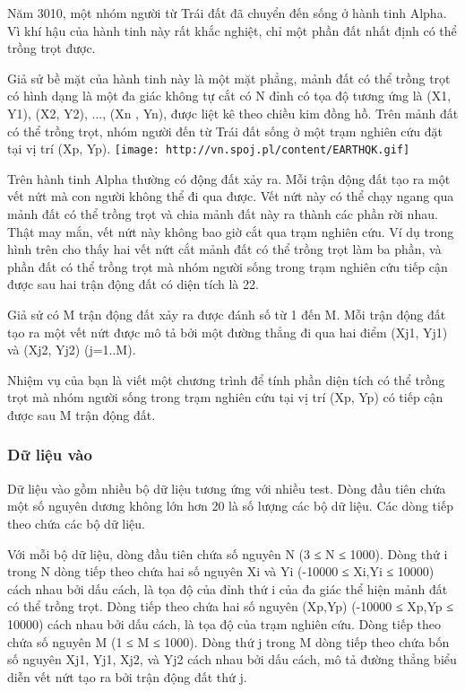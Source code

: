 



   Năm 3010, một nhóm người từ Trái đất đã chuyển đến sống ở hành tinh Alpha. Vì khí hậu của hành tinh này rất khắc nghiệt, chỉ một phần đất nhất định có thể trồng trọt được.  

   Giả sử bề mặt của hành tinh này là một mặt phẳng, mảnh đất có thể trồng trọt có hình dạng là một đa giác không tự cắt có N đỉnh có tọa độ tương ứng là (X1, Y1), (X2, Y2), ..., (Xn , Yn), được liệt kê theo chiều kim đồng hồ. Trên mảnh đất có thể trồng trọt, nhóm người đến từ Trái đất sống ở một trạm nghiên cứu đặt tại vị trí (Xp, Yp).  
\texttt{[image: http://vn.spoj.pl/content/EARTHQK.gif]}

   Trên hành tinh Alpha thường có động đất xảy ra. Mỗi trận động đất tạo ra một vết nứt mà con người không thể đi qua được. Vết nứt này có thể chạy ngang qua mảnh đất có thể trồng trọt và chia mảnh đất này ra thành các phần rời nhau. Thật may mắn, vết nứt này không bao giờ cắt qua trạm nghiên cứu. Ví dụ trong hình trên cho thấy hai vết nứt cắt mảnh đất có thể trồng trọt làm ba phần, và phần đất có thể trồng trọt mà nhóm người sống trong trạm nghiên cứu tiếp cận được sau hai trận động đất có diện tích là 22.  

   Giả sử có M trận động đất xảy ra được đánh số từ 1 đến M. Mỗi trận động đất tạo ra một vết nứt được mô tả bởi một đường thẳng đi qua hai điểm (Xj1, Yj1) và (Xj2, Yj2) (j=1..M).  

   Nhiệm vụ của bạn là viết một chương trình để tính phần diện tích có thể trồng trọt mà nhóm người sống trong trạm nghiên cứu tại vị trí (Xp, Yp) có tiếp cận được sau M trận động đất.  

\subsubsection{   Dữ liệu vào  }

   Dữ liệu vào gồm nhiều bộ dữ liệu tương ứng với nhiều test. Dòng đầu tiên chứa một số nguyên dương không lớn hơn 20 là số lượng các bộ dữ liệu. Các dòng tiếp theo chứa các bộ dữ liệu.  

   Với mỗi bộ dữ liệu, dòng đầu tiên chứa số nguyên N (3 ≤  N ≤  1000). Dòng thứ i trong N dòng tiếp theo chứa hai số nguyên Xi và Yi (-10000 ≤ Xi,Yi ≤ 10000) cách nhau bởi dấu cách, là tọa độ của đỉnh thứ i của đa giác thể hiện mảnh đất có thể trồng trọt. Dòng tiếp theo chứa hai số nguyên (Xp,Yp) (-10000 ≤ Xp,Yp ≤ 10000) cách nhau bởi dấu cách, là tọa độ của trạm nghiên cứu. Dòng tiếp theo chứa số nguyên M (1 ≤ M ≤ 1000). Dòng thứ j trong M dòng tiếp theo chứa bốn số nguyên Xj1, Yj1, Xj2, và Yj2 cách nhau bởi dấu cách, mô tả đường thẳng biểu diễn vết nứt tạo ra bởi trận động đất thứ j.  

